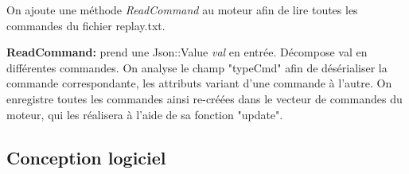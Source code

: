 On ajoute une méthode \textit{ReadCommand} au moteur afin de lire toutes les commandes du fichier replay.txt. 

\par \textbf{ReadCommand:} prend une Json::Value \textit{val} en entrée. Décompose val en différentes commandes. On analyse le champ "typeCmd" afin de désérialiser la commande correspondante, les attributs variant d'une commande à l'autre. On enregistre toutes les commandes ainsi re-créées dans le vecteur de commandes du moteur, qui les réalisera à l'aide de sa fonction "update".



\clearpage
\subsection{Conception logiciel}


%
